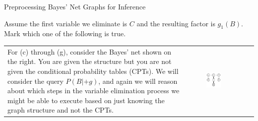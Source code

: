 \begin{problem}[]{Preprocessing Bayes' Net Graphs for Inference}
\begin{question}[2]
Assume the first variable we eliminate is $C$ and the resulting factor is $g_1(B)$. Mark which one of the following is true.
\begin{multicols}{3}
\begin{itemize}[label=, itemsep=12pt, topsep=12pt]
\TwoB
\end{itemize}
\end{multicols}
\end{question}

\begin{tabular}{ll}
\begin{minipage}{0.7\textwidth}
For (c) through (g),  consider the Bayes' net shown on the right.  You are given
the structure but you are not given the
conditional probability tables (CPTs).  We will consider the query $P(B|+g)$,
and again we will reason about which steps in the variable elimination process we might be able
to execute based on just knowing the graph structure and not the CPTs.
\end{minipage}
&
\begin{minipage}{0.25\textwidth}
\begin{figure}[H]
\centering
    \includegraphics[width=0.6\textwidth]{figures/FA12-MT2-Elimination3V2.pdf}
\end{figure}
\end{minipage}
\\
\end{tabular}



\end{problem}
